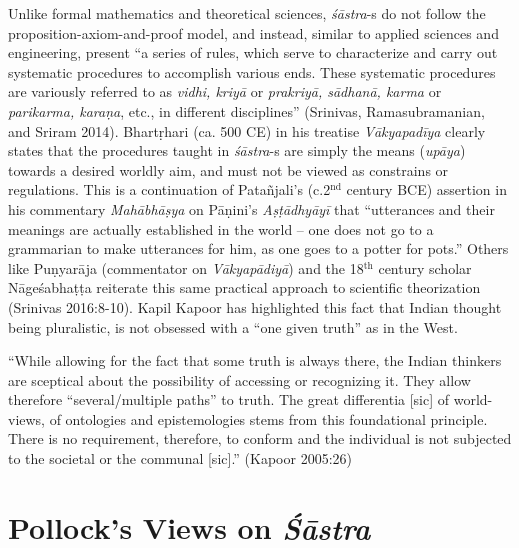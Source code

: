 Unlike formal mathematics and theoretical sciences, {\sl śāstra}-s do not follow the proposition-axiom-and-proof model, and instead, similar to applied sciences and engineering, present ``a series of rules, which serve to characterize and carry out systematic procedures to accomplish various ends. These systematic procedures are variously referred to as {\sl vidhi, kriyā} or {\sl prakriyā, sādhanā, karma} or {\sl parikarma, karaṇa}, etc., in different disciplines'' (Srinivas, Ramasubramanian, and Sriram 2014). Bhartṛhari (ca. 500 CE) in his treatise {\sl Vākyapadīya} clearly states that the procedures taught in {\sl śāstra}-s are simply the means ({\sl upāya}) towards a desired worldly aim, and must not be viewed as constrains or regulations. This is a continuation of Patañjali's (c.2$^{\text{nd}}$ century BCE) assertion in his commentary {\sl Mahābhāṣya} on Pāṇini’s {\sl Aṣṭādhyāyī} that ``utterances and their meanings are actually established in the world -- one does not go to a grammarian to make utterances for him, as one goes to a potter for pots.'' Others like Puṇyarāja (commentator on {\sl Vākyapādiyā}) and the 18$^{\text{th}}$ century scholar Nāgeśabhaṭṭa reiterate this same practical approach to scientific theorization (Srinivas 2016:8-10). Kapil Kapoor has highlighted this fact that Indian thought being pluralistic, is not obsessed with a ``one given truth'' as in the West. 
\begin{myquote}
``While allowing for the fact that some truth is always there, the Indian thinkers are sceptical about the possibility of accessing or recognizing it. They allow therefore ``several/multiple paths'' to truth. The great differentia [sic] of world-views, of ontologies and epistemologies stems from this foundational principle. There is no requirement, therefore, to conform and the individual is not subjected to the societal or the communal [sic].'' (Kapoor 2005:26)
\end{myquote}

\section*{Pollock’s Views on {\sl\bfseries Śāstra}}

